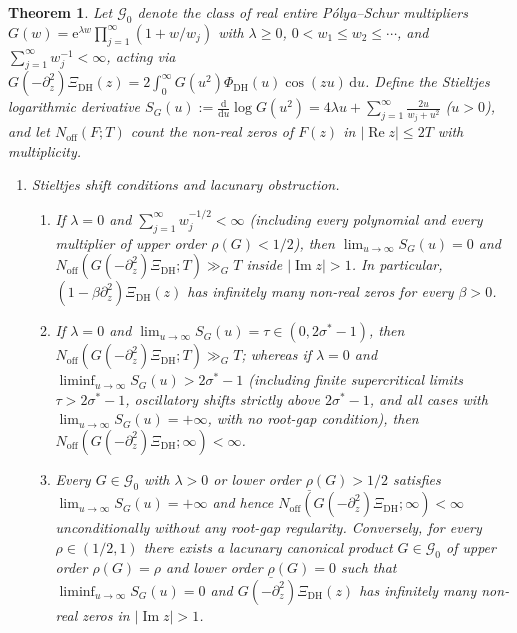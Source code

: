 \documentclass[11pt,a4paper,reqno]{amsart}
\newtheorem{theorem}{Theorem}[section]
\theoremstyle{definition}
\theoremstyle{remark}
\numberwithin{equation}{section}
\newcommand{\dd}{\mathrm{d}}
\newcommand{\ee}{\mathrm{e}}
\DeclareMathOperator{\Reop}{Re}
\DeclareMathOperator{\Imop}{Im}
\begin{document}
\begin{theorem}
\label{thm:main}
Let $\mathcal{G}_0$ denote the class of real entire P\'olya--Schur multipliers $G(w) = \ee^{\lambda w}\prod_{j=1}^{\infty}(1 + w/w_j)$ with $\lambda \ge 0$, $0 < w_1 \le w_2 \le \cdots$, and $\sum_{j=1}^{\infty} w_j^{-1} < \infty$, acting via $G(-\partial_z^2)\Xi_{\mathrm{DH}}(z) = 2\int_{0}^{\infty} G(u^2)\Phi_{\mathrm{DH}}(u)\cos(zu)\,\dd u$. Define the Stieltjes logarithmic derivative $S_G(u) := \frac{\dd}{\dd u}\log G(u^2) = 4\lambda u + \sum_{j=1}^{\infty}\frac{2u}{w_j + u^2}$ ($u > 0$), and let $N_{\mathrm{off}}(F; T)$ count the non-real zeros of $F(z)$ in $|\Reop z| \le 2T$ with multiplicity.
\begin{enumerate}[label=\textup{(\roman*)},leftmargin=2.2em]
  \item \emph{Stieltjes shift conditions and lacunary obstruction.}
  \begin{enumerate}[label=\textup{(\alph*)},leftmargin=1.7em]
    \item If $\lambda = 0$ and $\sum_{j=1}^{\infty} w_j^{-1/2} < \infty$ (including every polynomial and every multiplier of upper order $\rho(G) < 1/2$), then $\lim_{u\to\infty} S_G(u) = 0$ and $N_{\mathrm{off}}(G(-\partial_z^2)\Xi_{\mathrm{DH}}; T) \gg_G T$ inside $|\Imop z| > 1$. In particular, $(1 - \beta\partial_z^2)\Xi_{\mathrm{DH}}(z)$ has infinitely many non-real zeros for every $\beta > 0$.
    \item If $\lambda = 0$ and $\lim_{u\to\infty} S_G(u) = \tau \in (0, 2\sigma^* - 1)$, then $N_{\mathrm{off}}(G(-\partial_z^2)\Xi_{\mathrm{DH}}; T) \gg_G T$; whereas if $\lambda = 0$ and $\liminf_{u\to\infty} S_G(u) > 2\sigma^* - 1$ (including finite supercritical limits $\tau > 2\sigma^* - 1$, oscillatory shifts strictly above $2\sigma^* - 1$, and all cases with $\lim_{u\to\infty} S_G(u) = +\infty$, with no root-gap condition), then $N_{\mathrm{off}}(G(-\partial_z^2)\Xi_{\mathrm{DH}}; \infty) < \infty$.
    \item Every $G \in \mathcal{G}_0$ with $\lambda > 0$ or lower order $\underline{\rho}(G) > 1/2$ satisfies $\lim_{u\to\infty} S_G(u) = +\infty$ and hence $N_{\mathrm{off}}(G(-\partial_z^2)\Xi_{\mathrm{DH}}; \infty) < \infty$ unconditionally without any root-gap regularity. Conversely, for every $\rho \in (1/2, 1)$ there exists a lacunary canonical product $G \in \mathcal{G}_0$ of upper order $\rho(G) = \rho$ and lower order $\underline{\rho}(G) = 0$ such that $\liminf_{u\to\infty} S_G(u) = 0$ and $G(-\partial_z^2)\Xi_{\mathrm{DH}}(z)$ has infinitely many non-real zeros in $|\Imop z| > 1$.

\end{enumerate}
\end{enumerate}
\end{theorem}
\end{document}
